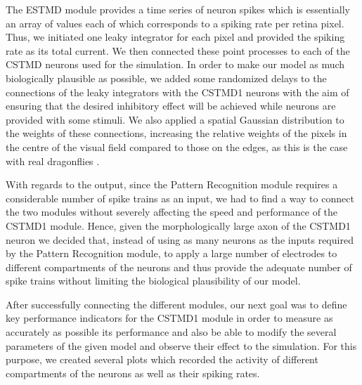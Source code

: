 \documentclass[a4paper,11pt]{article}
\begin{document}
The ESTMD module provides a time series of neuron spikes which is essentially an array of values each of which corresponds to a spiking rate per retina pixel. Thus, we initiated one leaky integrator for each pixel and provided the spiking rate as its total current. We then connected these point processes to each of the CSTMD neurons used for the simulation. In order to make our model as much biologically plausible as possible, we added some randomized delays to the connections of the leaky integrators with the CSTMD1 neurons with the aim of ensuring that the desired inhibitory effect will be achieved while neurons are provided with some stimuli. We also applied a spatial Gaussian distribution to the weights of these connections, increasing the relative weights of the pixels in the centre of the visual field compared to those on the edges, as this is the case with real dragonflies \cite{w13}.

With regards to the output, since the Pattern Recognition module requires a considerable number of spike trains as an input, we had to find a way to connect the two modules without severely affecting the speed and performance of the CSTMD1 module. Hence, given the morphologically large axon of the CSTMD1 neuron \cite{geurten} we decided that, instead of using as many neurons as the inputs required by the Pattern Recognition module, to apply a large number of electrodes to different compartments of the neurons and thus provide the adequate number of spike trains without limiting the biological plausibility of our model.

After successfully connecting the different modules, our next goal was to define key performance indicators for the CSTMD1 module in order to measure as accurately as possible its performance and also be able to modify the several parameters of the given model and observe their effect to the simulation. For this purpose, we created several plots which recorded the activity of different compartments of the neurons as well as their spiking rates. 
\end{document}

